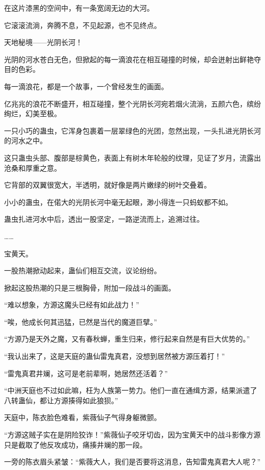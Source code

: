 
\begin{this_body}

在这片漆黑的空间中，有一条宽阔无边的大河。

它滚滚流淌，奔腾不息，不见起源，也不见终点。

天地秘境——光阴长河！

光阴的河水苍白无色，但掀起的每一滴浪花在相互碰撞的时候，却会迸射出鲜艳夺目的色彩。

每一滴浪花，都是一个故事，一个曾经发生的画面。

亿兆兆的浪花不断盛开，相互碰撞，整个光阴长河宛若烟火流淌，五颜六色，缤纷绚烂，幻美至极。

一只小巧的蛊虫，它浑身包裹着一层翠绿色的光团，忽然出现，一头扎进光阴长河的河水之中。

这只蛊虫头部、腹部是棕黄色，表面上有树木年轮般的纹理，见证了岁月，流露出沧桑和厚重之意。

它背部的双翼很宽大，半透明，就好像是两片嫩绿的树叶交叠着。

小小的蛊虫，在偌大的光阴长河中毫无起眼，渺小得连一只蚂蚁都不如。

蛊虫扎进河水中后，透出一股坚定，一路逆流而上，追溯过往。

……

宝黄天。

一股热潮掀动起来，蛊仙们相互交流，议论纷纷。

掀起这股热潮的只是三根胸骨，附加一段战斗的画面。

“难以想象，方源这魔头已经有如此战力！”

“唉，他成长何其迅猛，已然是当代的魔道巨擘。”

“方源乃是天外之魔，又有春秋蝉，重生归来，修行起来自然是有巨大优势的。”

“我认出来了，这是天庭的蛊仙雷鬼真君，没想到居然被方源压着打！”

“雷鬼真君井斓，这可是老前辈啊，她居然还活着？”

“中洲天庭也不过如此嘛，枉为人族第一势力。他们一直在通缉方源，结果派遣了八转蛊仙，都让方源揍得如此狼狈。”

天庭中，陈衣脸色难看，紫薇仙子气得身躯微颤。

“方源这贼子实在是阴险狡诈！”紫薇仙子咬牙切齿，因为宝黄天中的战斗影像方源只是截取了他反攻成功，痛揍井斓的那一段。

一旁的陈衣眉头紧皱：“紫薇大人，我们是否要将这消息，告知雷鬼真君大人呢？”


\end{this_body}
